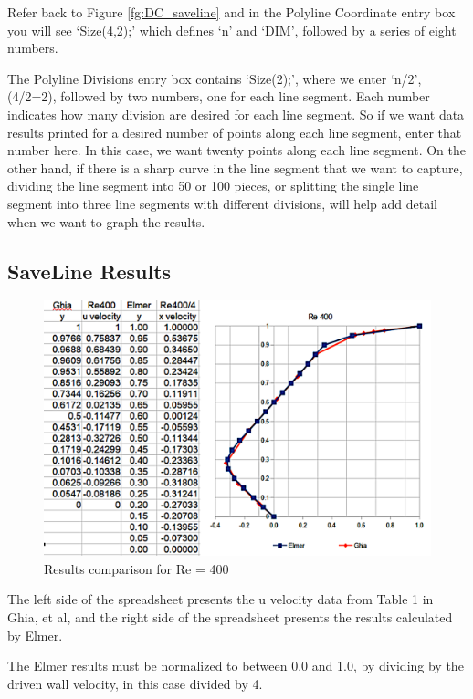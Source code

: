 Refer back to Figure \ref{fg:DC_saveline} and in the Polyline Coordinate entry box you will
see `Size(4,2);' which defines `n' and `DIM', followed by a series of eight numbers.

The Polyline Divisions entry box contains `Size(2);', where we enter `n/2', (4/2=2), followed by
two numbers, one for each line segment.  Each number indicates how many division are desired
for each line segment.  So if we want data results printed for a desired number of points along each
line segment, enter that number here.  In this case, we want twenty points along each line
segment.  On the other hand, if there is a sharp curve in the line segment that we want to
capture, dividing the line segment into 50 or 100 pieces, or splitting the single line segment into
three line segments with different divisions, will help add detail when we want to graph the results.

\subsection*{SaveLine Results}

\begin{figure}[H]
\centering
\includegraphics[scale=1.3]{Re400_compare}
\caption{Results comparison for Re = 400}\label{fg:results-400}
\end{figure} 

The left side of the spreadsheet presents the u velocity data from Table 1 in Ghia, et al, and
the right side of the spreadsheet presents the results calculated by Elmer.

The Elmer results must be normalized to between 0.0 and 1.0, by dividing by the
driven wall velocity, in this case divided by 4.

